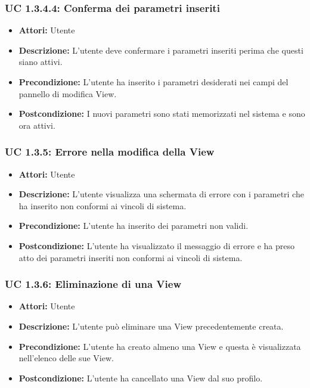 \subsubsection{UC 1.3.4.4: Conferma dei parametri inseriti}

\begin{itemize}
\item \textbf{Attori:} Utente
\item \textbf{Descrizione:} L'utente deve confermare i parametri inseriti perima che questi siano attivi.
\item \textbf{Precondizione:} L'utente ha inserito i parametri desiderati nei campi del pannello di modifica View.
\item \textbf{Postcondizione:} I nuovi parametri sono stati memorizzati nel sistema e sono ora attivi.
\end{itemize}

\subsubsection{UC 1.3.5: Errore nella modifica della View}

\begin{itemize}
\item \textbf{Attori:} Utente
\item \textbf{Descrizione:} L'utente visualizza una schermata di errore con i parametri che ha inserito non conformi ai vincoli di sistema.
\item \textbf{Precondizione:} L'utente ha inserito dei parametri non validi.
\item \textbf{Postcondizione:} L'utente ha visualizzato il messaggio di errore e ha preso atto dei parametri inseriti non conformi ai vincoli di sistema.
\end{itemize}

\subsubsection{UC 1.3.6: Eliminazione di una View}

\begin{itemize}
\item \textbf{Attori:} Utente
\item \textbf{Descrizione:} L'utente può eliminare una View precedentemente creata.
\item \textbf{Precondizione:} L'utente ha creato almeno una View e questa è visualizzata nell'elenco delle sue View.
\item \textbf{Postcondizione:} L'utente ha cancellato una View dal suo profilo.
\end{itemize}

